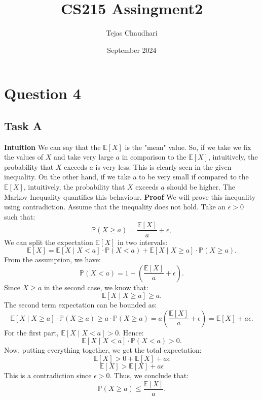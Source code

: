 \documentclass{article}
\title{CS215 Assingment2}
\author{Tejas Chaudhari}
\date{September 2024}
\begin{document}
\maketitle

\section*{Question 4}
\subsection*{Task A}

\textbf{Intuition}
\newline
We can say that the $\mathbb{E}[X]$ is the "mean" value. So, if we take we fix the values of $X$ and take very large $a$ in comparison to the $\mathbb{E}[X]$, intuitively, the probability that $X$ exceeds $a$ is very less. This is clearly seen in the given inequality.
\newline
On the other hand, if we take a to be very small if compared to the $\mathbb{E}[X]$, intuitively, the probability that $X$ exceeds $a$ should be higher. The Markov Inequality quantifies this behaviour.
\newline
\newline
\textbf{Proof}
\newline
We will prove this inequality using contradiction. Assume that the inequality does not hold. Take an  $\epsilon > 0$ such that: 
\[
\mathbb{P}(X \geq a) = \frac{\mathbb{E}[X]}{a} + \epsilon,
\]
We can split the expectation \(\mathbb{E}[X]\) in two intervals:
\[
\mathbb{E}[X] = \mathbb{E}[X \mid X < a] \cdot \mathbb{P}(X < a) + \mathbb{E}[X \mid X \geq a] \cdot \mathbb{P}(X \geq a).
\]
From the assumption, we have:
\[ \mathbb{P}(X < a) = 1 - \left( \frac{\mathbb{E}[X]}{a} + \epsilon \right).
\]
Since \(X \geq a\) in the second case, we know that:
\[
\mathbb{E}[X \mid X \geq a] \geq a.
\]
The second term expectation can be bounded as:
\[
\mathbb{E}[X \mid X \geq a] \cdot \mathbb{P}(X \geq a) \geq a \cdot \mathbb{P}(X \geq a) = a \left( \frac{\mathbb{E}[X]}{a} + \epsilon \right) = \mathbb{E}[X] + a \epsilon.
\]
For the first part,  \(\mathbb{E}[X \mid X < a] > 0\). Hence:
\[
\mathbb{E}[X \mid X < a] \cdot \mathbb{P}(X < a) > 0.
\]
Now, putting everything together, we get the total expectation:
\[
\mathbb{E}[X] > 0+ \mathbb{E}[X] + a \epsilon 
\]
\[
\mathbb{E}[X] > \mathbb{E}[X] + a \epsilon 
\]
This is a contradiction since $\epsilon > 0$.
Thus, we conclude that:
\[
\mathbb{P}(X \geq a) \leq \frac{\mathbb{E}[X]}{a}.
\]
\end{document}
